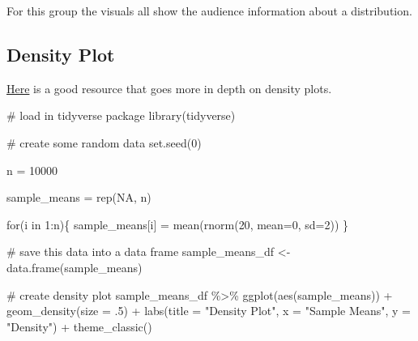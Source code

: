 \documentclass[
  letterpaper,
  DIV=11,
  numbers=noendperiod]{scrreprt}
\newenvironment{Shaded}{\begin{snugshade}}{\end{snugshade}}
\newcommand{\AttributeTok}[1]{\textcolor[rgb]{0.40,0.45,0.13}{#1}}
\newcommand{\CommentTok}[1]{\textcolor[rgb]{0.37,0.37,0.37}{#1}}
\newcommand{\ConstantTok}[1]{\textcolor[rgb]{0.56,0.35,0.01}{#1}}
\newcommand{\ControlFlowTok}[1]{\textcolor[rgb]{0.00,0.23,0.31}{#1}}
\newcommand{\DecValTok}[1]{\textcolor[rgb]{0.68,0.00,0.00}{#1}}
\newcommand{\FunctionTok}[1]{\textcolor[rgb]{0.28,0.35,0.67}{#1}}
\newcommand{\NormalTok}[1]{\textcolor[rgb]{0.00,0.23,0.31}{#1}}
\newcommand{\OtherTok}[1]{\textcolor[rgb]{0.00,0.23,0.31}{#1}}
\newcommand{\SpecialCharTok}[1]{\textcolor[rgb]{0.37,0.37,0.37}{#1}}
\newcommand{\StringTok}[1]{\textcolor[rgb]{0.13,0.47,0.30}{#1}}
\begin{document}
For this group the visuals all show the audience information about a
distribution.

\hypertarget{density-plot}{%
\subsection{Density Plot}\label{density-plot}}

\href{https://www.data-to-viz.com/graph/density.html}{Here} is a good
resource that goes more in depth on density plots.

\begin{Shaded}
\begin{Highlighting}[]
\CommentTok{\# load in tidyverse package}
\FunctionTok{library}\NormalTok{(tidyverse)}

\CommentTok{\# create some random data}
\FunctionTok{set.seed}\NormalTok{(}\DecValTok{0}\NormalTok{)}

\NormalTok{n }\OtherTok{=} \DecValTok{10000}

\NormalTok{sample\_means }\OtherTok{=} \FunctionTok{rep}\NormalTok{(}\ConstantTok{NA}\NormalTok{, n)}

\ControlFlowTok{for}\NormalTok{(i }\ControlFlowTok{in} \DecValTok{1}\SpecialCharTok{:}\NormalTok{n)\{}
\NormalTok{  sample\_means[i] }\OtherTok{=} \FunctionTok{mean}\NormalTok{(}\FunctionTok{rnorm}\NormalTok{(}\DecValTok{20}\NormalTok{, }\AttributeTok{mean=}\DecValTok{0}\NormalTok{, }\AttributeTok{sd=}\DecValTok{2}\NormalTok{))}
\NormalTok{\}}

\CommentTok{\# save this data into a data frame }
\NormalTok{sample\_means\_df }\OtherTok{\textless{}{-}} \FunctionTok{data.frame}\NormalTok{(sample\_means)}

\CommentTok{\# create density plot }
\NormalTok{sample\_means\_df }\SpecialCharTok{\%\textgreater{}\%}
   \FunctionTok{ggplot}\NormalTok{(}\FunctionTok{aes}\NormalTok{(sample\_means)) }\SpecialCharTok{+} 
   \FunctionTok{geom\_density}\NormalTok{(}\AttributeTok{size =}\NormalTok{ .}\DecValTok{5}\NormalTok{) }\SpecialCharTok{+}
   \FunctionTok{labs}\NormalTok{(}\AttributeTok{title =} \StringTok{"Density Plot"}\NormalTok{, }\AttributeTok{x =} \StringTok{"Sample Means"}\NormalTok{, }\AttributeTok{y =} \StringTok{"Density"}\NormalTok{) }\SpecialCharTok{+} 
   \FunctionTok{theme\_classic}\NormalTok{()}
\end{Highlighting}
\end{Shaded}
\end{document}
